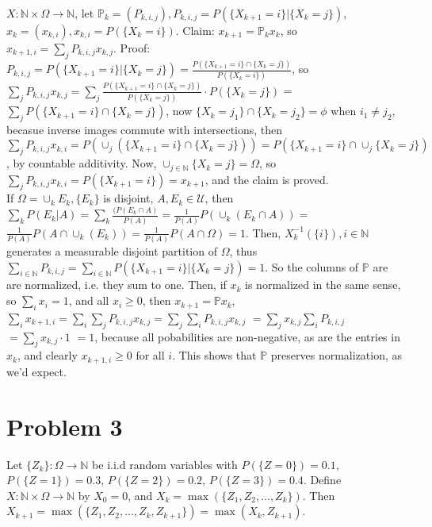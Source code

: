 \documentclass[12pt]{article}
\newcommand{\nats}[0] { \mathbb{N}}
\newcommand{\U}[0] { \mathcal{U} }
\newcommand{\Om}[0] { \Omega }
\newcommand{\rarw}[0] { \rightarrow }
\begin{document}
$X:\nats \times \Om \rarw \nats$, let $\mathbb{P}_k = (P_{k,i,j}), P_{k,i,j} = P(\{ X_{k+1} = i \} | \{X_k = j \})$, $x_k = (x_{k,i}), x_{k,i} = P(\{ X_k = i\})$. Claim: $x_{k+1} = \mathbb{P}_k x_k$, so $x_{k+1,i} = \sum_j P_{k,i,j} x_{k,j}$. Proof: $P_{k,i,j}  = P(\{ X_{k+1} = i \} | \{ X_k = j \}) = \frac{ P(\{ X_{k+1} = i\} \cap \{ X_k = j \}) } { P(\{X_k = i  \}) }$, so $ \sum_j P_{k,i,j} x_{k,j} = \sum_j \frac{ P(\{ X_{k+1} = i\} \cap \{ X_k = j \}) } { P(\{X_k = j  \}) } \cdot P(\{X_k = j  \}) $ = $\sum_j P(\{ X_{k+1} = i\} \cap \{ X_k = j \}) $, now  $ \{ X_{k} = j_1\} \cap \{ X_{k} = j_2\} = \phi $ when $i_1 \not = j_2$, becasue inverse images commute with intersections, then  $ \sum_j P_{k,i,j} x_{k,i}  = P \left( \cup_j \left( \{ X_{k+1} = i\} \cap \{ X_k = j \}  \right) \right) =  P \left( \{ X_{k+1} = i \}  \cap \cup_j \{ X_{k} = j\} \right)$, by countable additivity. Now, $\cup_{j \in \nats} \{ X_{k} = j\} = \Om$, so $\sum_j P_{k,i,j} x_{k,i}  =  P \left( \{ X_{k+1} = i \} \right) = x_{k+1} $, and the claim is proved. \\

If $\Om = \cup_k E_k, \{E_k \}$ is disjoint, $A, E_k \in \U$, then $\sum_k P(E_k | A ) = \sum_k \frac{(P(E_k \cap A)}{P(A)} = \frac{1}{P(A)} P \left(  \cup_k (E_k \cap A )\right) = $ 
$\frac{1}{P(A)} P \left( A \cap \cup_k (E_k  )\right) = \frac{1}{P(A)} P \left( A \cap \Om \right) = 1$. Then, $X_k^{-1}(\{i\}), i \in \nats$ generates a measurable disjoint partition of $\Om$, thus $ \sum_{i \in \nats} P_{k,i,j} = \sum_{i \in \nats} P(\{ X_{k+1} = i \} | \{X_k = j \}) = 1$. So the columns of $\mathbb{P}$ are are normalized, i.e. they sum to one. Then, if $x_k$ is normalized in the same sense, so $\sum_i x_i = 1$, and all $x_i \ge 0$, then $x_{k+1} = \mathbb{P} x_k$, $ \sum_i x_{k+1,i} = \sum_i \sum_j P_{k,i,j} x_{k,j} = \sum_j \sum_i P_{k,i,j} x_{k,j} $ $ = \sum_j  x_{k,j} \sum_i P_{k,i,j} $  $ = \sum_j  x_{k,j} \cdot 1 $ $ = 1$, because all pobabilities are non-negative, as are the entries in $x_k$, and clearly $x_{{k+1},i} \ge 0$ for all $i$. This shows that $\mathbb{P}$ preserves normalization, as we'd expect.


\section*{Problem 3}

Let $\{ Z_k\}: \Om \rarw \nats $ be i.i.d random variables with  $P(\{ Z=0 \})=0.1$, $P(\{ Z=1 \})=0.3$,  $P(\{ Z=2 \})=0.2$,  $P(\{ Z=3 \})=0.4$. Define $X: \nats \times \Om \rarw \nats$ by $X_0 = 0$, and $X_k = \max( \{ Z_1, Z_2, ... , Z_k \} )$. Then $X_{k+1} = \max( \{ Z_1, Z_2, ... , Z_k, Z_{k+1} \} ) = \max( X_k, Z_{k+1} )$. \\
\end{document}
